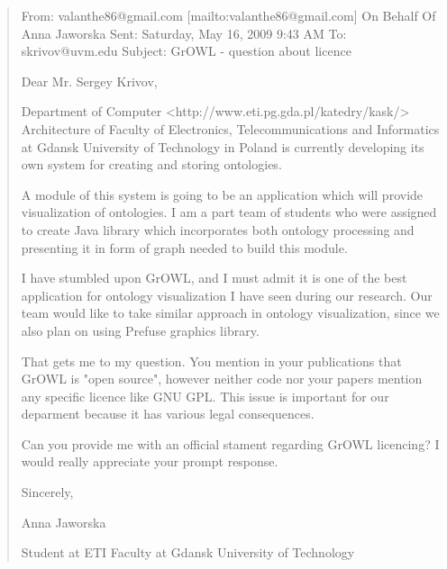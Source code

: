\documentclass[a4paper,10pt]{article}
\begin{document}
\begin{quote}
 
From: valanthe86@gmail.com [mailto:valanthe86@gmail.com] On Behalf Of Anna Jaworska
Sent: Saturday, May 16, 2009 9:43 AM
To: skrivov@uvm.edu
Subject: GrOWL - question about licence

 
Dear Mr. Sergey Krivov,

Department of Computer <http://www.eti.pg.gda.pl/katedry/kask/>  Architecture of
Faculty of Electronics, Telecommunications and Informatics at Gdansk University of
Technology in Poland is currently developing its own system for creating and storing
ontologies.

A module of this system is going to be an application which will provide
visualization of ontologies. I am a part team of students who were assigned to
create Java library which incorporates both ontology processing and presenting it in
form of graph needed to build this module. 

I have stumbled upon GrOWL, and I must admit it is one of the best application for
ontology visualization I have seen during our research. Our team would like to take
similar approach in ontology visualization, since we also plan on using Prefuse
graphics library.

That gets me to my question. You mention in your publications that GrOWL is "open
source", however neither code nor your papers mention any specific licence like GNU
GPL. This issue is important for our deparment because it has various legal
consequences. 

Can you provide me with an official stament regarding GrOWL licencing? I would
really appreciate your prompt response.

Sincerely,

Anna Jaworska

Student at ETI Faculty at Gdansk University of Technology



\end{quote}
\newpage
\end{document}

